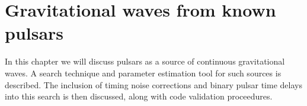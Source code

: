 

\chapter{Gravitational waves from known pulsars}
In this chapter we will discuss pulsars as a source of continuous gravitational waves. A search
technique and parameter estimation tool for such sources is described. The inclusion of timing
noise corrections and binary pulsar time delays into this search is then discussed, along with code
validation proceedures.

